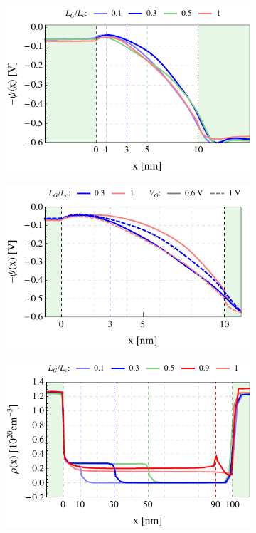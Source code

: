 \documentclass[11pt, a4paper]{article}
\begin{document}
\begin{figure}[b]
\begin{subfigure}{0.245\linewidth}
		\caption{}\label{fig:3:4a}
	\end{subfigure}
	\begin{subfigure}{0.245\linewidth}
		\centering
		\includegraphics[width=1\linewidth]{potxPG10}
		\caption{}\label{fig:3:3a}
	\end{subfigure}
	\begin{subfigure}{0.245\linewidth}
		\centering
		\includegraphics[width=1\linewidth]{potxPG10vg0610_new}
		\caption{}\label{fig:3:5a}
	\end{subfigure}
	\begin{subfigure}{0.245\linewidth}
		\centering
		\includegraphics[width=1\linewidth]{ndxPG100}

\end{subfigure}
\end{figure}
\end{document}
